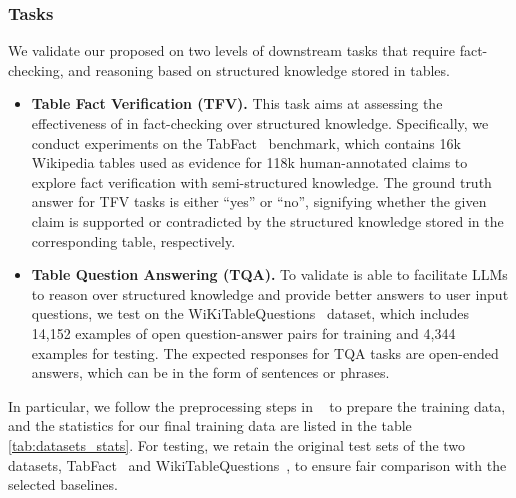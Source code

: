 \subsubsection{Tasks} We validate our proposed \name on two levels of downstream tasks that require fact-checking, and reasoning based on structured knowledge stored in tables.
\begin{itemize}[leftmargin=*]
    \item \textbf{Table Fact Verification (TFV).} This task aims at assessing the effectiveness of \name in fact-checking over structured knowledge. Specifically, we conduct experiments on the TabFact~\cite{2019TabFactA} benchmark, which contains 16k Wikipedia tables used as evidence for 118k human-annotated claims to explore fact verification with semi-structured knowledge. The ground truth answer for TFV tasks is either ``yes'' or ``no'', signifying whether the given claim is supported or contradicted by the structured knowledge stored in the corresponding table, respectively. 
    \item \textbf{Table Question Answering (TQA).} To validate \name is able to facilitate LLMs to reason over structured knowledge and provide better answers to user input questions, we test on the WiKiTableQuestions~\cite{pasupat2015compositional} dataset, which includes 14,152 examples of open question-answer pairs for training and 4,344 examples for testing. The expected responses for TQA tasks are open-ended answers, which can be in the form of sentences or phrases.
\end{itemize}


In particular, we follow the preprocessing steps in ~\cite{yin2020tabert} to prepare the training data, and the statistics for our final training data are listed in the table \ref{tab:datasets_stats}. For testing, we retain the original test sets of the two datasets, TabFact~\cite{2019TabFactA} and WikiTableQuestions~\cite{pasupat2015compositional}, to ensure fair comparison with the selected baselines.

